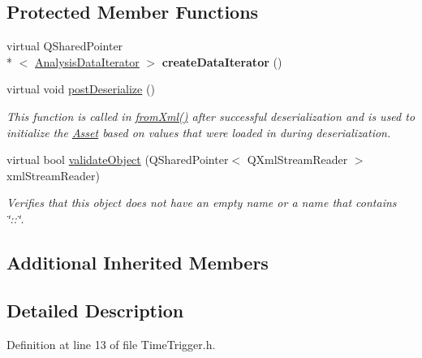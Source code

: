 \subsection*{Protected Member Functions}
\begin{DoxyCompactItemize}
\item 
\hypertarget{class_picto_1_1_time_trigger_a0c0ff54abfc324d2a86f356ddc6227fd}{virtual Q\-Shared\-Pointer\\*
$<$ \hyperlink{class_picto_1_1_analysis_data_iterator}{Analysis\-Data\-Iterator} $>$ {\bfseries create\-Data\-Iterator} ()}\label{class_picto_1_1_time_trigger_a0c0ff54abfc324d2a86f356ddc6227fd}

\item 
virtual void \hyperlink{class_picto_1_1_time_trigger_a6d3df7f29aacc9f7dc67f5db96a682af}{post\-Deserialize} ()
\begin{DoxyCompactList}\small\item\em This function is called in \hyperlink{class_picto_1_1_asset_a8bed4da09ecb1c07ce0dab313a9aba67}{from\-Xml()} after successful deserialization and is used to initialize the \hyperlink{class_picto_1_1_asset}{Asset} based on values that were loaded in during deserialization. \end{DoxyCompactList}\item 
\hypertarget{class_picto_1_1_time_trigger_aaf1915d6b5c4c9544b88c86845be6bcb}{virtual bool \hyperlink{class_picto_1_1_time_trigger_aaf1915d6b5c4c9544b88c86845be6bcb}{validate\-Object} (Q\-Shared\-Pointer$<$ Q\-Xml\-Stream\-Reader $>$ xml\-Stream\-Reader)}\label{class_picto_1_1_time_trigger_aaf1915d6b5c4c9544b88c86845be6bcb}

\begin{DoxyCompactList}\small\item\em Verifies that this object does not have an empty name or a name that contains \char`\"{}\-::\char`\"{}. \end{DoxyCompactList}\end{DoxyCompactItemize}
\subsection*{Additional Inherited Members}


\subsection{Detailed Description}


Definition at line 13 of file Time\-Trigger.\-h.



